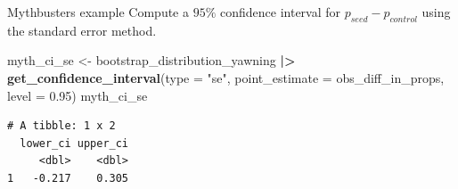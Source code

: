 \documentclass[
  ignorenonframetext,
]{beamer}
\newenvironment{Shaded}{\begin{snugshade}}{\end{snugshade}}
\newcommand{\AttributeTok}[1]{\textcolor[rgb]{0.13,0.29,0.53}{#1}}
\newcommand{\FloatTok}[1]{\textcolor[rgb]{0.00,0.00,0.81}{#1}}
\newcommand{\FunctionTok}[1]{\textcolor[rgb]{0.13,0.29,0.53}{\textbf{#1}}}
\newcommand{\NormalTok}[1]{#1}
\newcommand{\OtherTok}[1]{\textcolor[rgb]{0.56,0.35,0.01}{#1}}
\newcommand{\SpecialCharTok}[1]{\textcolor[rgb]{0.81,0.36,0.00}{\textbf{#1}}}
\newcommand{\StringTok}[1]{\textcolor[rgb]{0.31,0.60,0.02}{#1}}
\begin{document}
\begin{frame}[fragile]{Mythbusters example}
\protect\hypertarget{mythbusters-example-4}{}
Compute a \(95\%\) confidence interval for \(p_{seed}-p_{control}\)
using the standard error method.

\normalsize

\begin{Shaded}
\begin{Highlighting}[]
\NormalTok{myth\_ci\_se }\OtherTok{\textless{}{-}}\NormalTok{ bootstrap\_distribution\_yawning }\SpecialCharTok{|\textgreater{}} 
  \FunctionTok{get\_confidence\_interval}\NormalTok{(}\AttributeTok{type =} \StringTok{"se"}\NormalTok{, }
                          \AttributeTok{point\_estimate =}\NormalTok{ obs\_diff\_in\_props,}
                          \AttributeTok{level =} \FloatTok{0.95}\NormalTok{)}
\NormalTok{myth\_ci\_se}
\end{Highlighting}
\end{Shaded}

\begin{verbatim}
# A tibble: 1 x 2
  lower_ci upper_ci
     <dbl>    <dbl>
1   -0.217    0.305
\end{verbatim}

\normalsize
\end{frame}
\end{document}
